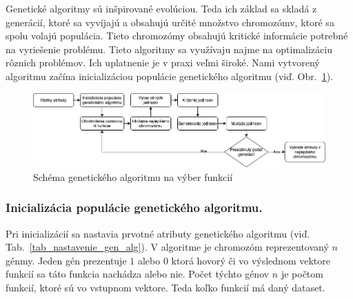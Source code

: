 \documentclass[runningheads]{llncs}
\begin{document}
Genetické algoritmy sú inšpirované evolúciou. Teda ich základ sa skladá z generácií, ktoré sa vyvíjajú a obsahujú 
určité množstvo chromozómv, ktoré sa spolu volajú populácia. Tieto chromozómy obsahujú kritické informácie 
potrebné na vyriešenie problému. Tieto algoritmy sa využívaju najme na optimalizáciu rôznich
problémov. Ich uplatnenie je v praxi veľmi široké.\cite{ref_babatunde,ref_whitley} Nami vytvorený algoritmu začína 
inicializáciou populácie genetického algoritmu (viď. Obr.~\ref{fig_ga_rozdelenie}).
\begin{figure}
\includegraphics[width=\textwidth]{image/GA_alg.png}
\caption{Schéma genetického algoritmu na výber funkcií} \label{fig_ga_rozdelenie}
\end{figure}
    
\subsubsection{Inicializácia populácie genetického algoritmu.}

Pri inicializácií sa nastavia prvotné atributy genetického algoritmu (viď. Tab.~\ref{tab_nastavenie_gen_alg}). 
V algoritme je chromozóm reprezentovaný \begin{math}n\end{math} génmy. Jeden gén prezentuje \begin{math}1\end{math} 
alebo \begin{math}0\end{math} ktorá hovorý či vo výslednom vektore funkcií sa táto funkcia nachádza alebo nie. 
Počet týchto génov \begin{math}n\end{math} je počtom funkcií, ktoré sú vo vstupnom vektore. Teda 
koľko funkcií má daný dataset.
\end{document}
